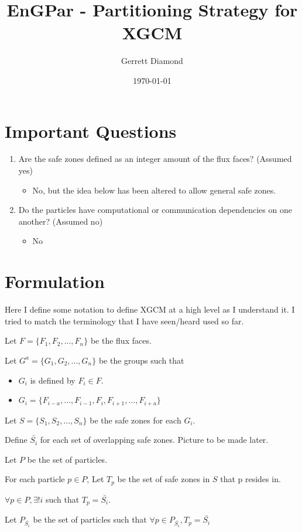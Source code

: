 \documentclass[a4paper]{article}
\title{EnGPar - Partitioning Strategy for XGCM}
\author{Gerrett Diamond}
\date{\today}
\begin{document}
\maketitle

\section{Important Questions}
\begin{enumerate}
\item Are the safe zones defined as an integer amount of the flux faces? (Assumed yes)
  {\color{red}
    \begin{itemize}
    \item No, but the idea below has been altered to allow general safe zones.
    \end{itemize}
  }
\item Do the particles have computational or communication dependencies on one another? (Assumed no)
  {\color{red}
    \begin{itemize}
    \item No
    \end{itemize}
  }
\end{enumerate}

\section{Formulation}
Here I define some notation to define XGCM at a high level as I understand it. I tried to match the terminology that I have seen/heard used so far. \\

\begin{itemize}
\item Let $F = \{F_1,F_2, ..., F_n\}$ be the flux faces.
\item Let $G^a = \{G_1, G_2, ..., G_n\}$ be the groups such that
  \begin{itemize}
  \item $G_i$ is defined by $F_i\in F$.
  \item $G_i = \{F_{i-a},...,F_{i-1},F_i,F_{i+1},...,F_{i+a}\}$ 
  \end{itemize}
\item Let $S = \{S_1,S_2,...,S_n\}$ be the safe zones for each $G_i$.
  {\color{blue}
  \item Define $\bar{S_i}$ for each set of overlapping safe zones. Picture to be made later.
  }
\item Let $P$ be the set of particles.
\item For each particle $p\in P$, Let $T_p$ be the set of safe zones in $S$ that p resides in.   {\color{blue} $\forall p \in P, \exists ! i$ such that $T_p = \bar{S_i}$.
\item  Let $P_{\bar{S_i}}$ be the set of particles such that $\forall p \in P_{\bar{S_i}}, T_p = \bar{S_i}$
  }
\end{itemize}
\end{document}
